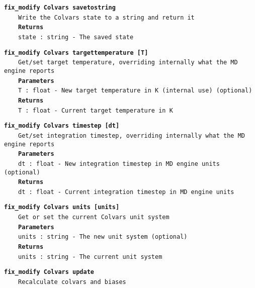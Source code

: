 \begin{mdexampleinput}{}
\texttt{\textbf{fix\_modify Colvars savetostring}}
\\
\-~~~~\texttt{Write the Colvars state to a string and return it}
\\
\-~~~~\texttt{\textbf{Returns}}
\\
\-~~~~\texttt{state : string - The saved state}
\end{mdexampleinput}
\begin{mdexampleinput}{}
\texttt{\textbf{fix\_modify Colvars targettemperature [T]}}
\\
\-~~~~\texttt{Get/set target temperature, overriding internally what the MD engine reports}
\\
\-~~~~\texttt{\textbf{Parameters}}
\\
\-~~~~\texttt{T : float - New target temperature in K (internal use) (optional)}
\\
\-~~~~\texttt{\textbf{Returns}}
\\
\-~~~~\texttt{T : float - Current target temperature in K}
\end{mdexampleinput}
\begin{mdexampleinput}{}
\texttt{\textbf{fix\_modify Colvars timestep [dt]}}
\\
\-~~~~\texttt{Get/set integration timestep, overriding internally what the MD engine reports}
\\
\-~~~~\texttt{\textbf{Parameters}}
\\
\-~~~~\texttt{dt : float - New integration timestep in MD engine units (optional)}
\\
\-~~~~\texttt{\textbf{Returns}}
\\
\-~~~~\texttt{dt : float - Current integration timestep in MD engine units}
\end{mdexampleinput}
\begin{mdexampleinput}{}
\texttt{\textbf{fix\_modify Colvars units [units]}}
\\
\-~~~~\texttt{Get or set the current Colvars unit system}
\\
\-~~~~\texttt{\textbf{Parameters}}
\\
\-~~~~\texttt{units : string - The new unit system (optional)}
\\
\-~~~~\texttt{\textbf{Returns}}
\\
\-~~~~\texttt{units : string - The current unit system}
\end{mdexampleinput}
\begin{mdexampleinput}{}
\texttt{\textbf{fix\_modify Colvars update}}
\\
\-~~~~\texttt{Recalculate colvars and biases}
\end{mdexampleinput}
